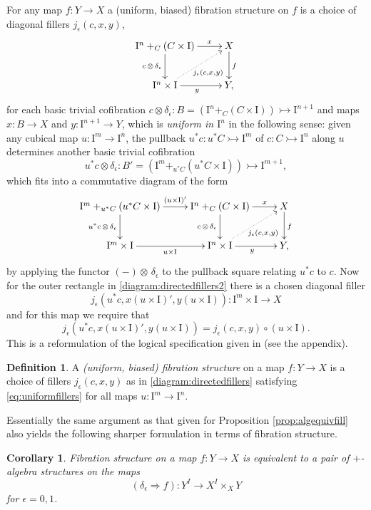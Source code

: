 \documentclass[12pt]{article}
\newcommand{\mono}{\ensuremath{\rightarrowtail}}
\newcommand{\ra}{\ensuremath{\rightarrow}}
\newcommand{\I}{\ensuremath{\mathrm{I}}}
\newtheorem{corollary}[theorem]{Corollary}
\theoremstyle{remark}
\theoremstyle{definition}
\newtheorem{definition}[theorem]{Definition}
\begin{document}
For any map $f:Y\ra X$  a (uniform, biased) fibration structure on $f$ is a choice of diagonal fillers $j_\epsilon(c,x,y)$,
\begin{equation}\label{diagram:directedfillers}
\xymatrix{
\I^n +_C (C\times\I) \ar[d]_{c\,\otimes\,\delta_\epsilon} \ar[r]^-{x} & X \ar[d]^f \\
\I^{n}\times \I \ar@{.>}[ru]_{j_\epsilon(c,x,y)} \ar[r]_y & Y,
}
\end{equation}
for each basic trivial cofibration $c \otimes \delta_\epsilon : B = (\I^n +_C (C\times\I)) \mono \I^{n+1}$ and maps $x : B\ra X$ and $y : \I^{n+1}\ra Y$, which is \emph{uniform in $\I^{n}$} in the following sense: given any cubical map $u : \I^m \ra \I^n$, the pullback $u^*c : u^*C\mono \I^m$ of $c : C\mono \I^n$ along $u$ determines another basic trivial cofibration $$u^*c \otimes \delta_\epsilon : B' = (\I^m +_{u^*C} (u^*C\times\I)) \mono \I^{m+1},$$ which fits into a commutative diagram of the form
\begin{equation}\label{diagram:directedfillers2}
\xymatrix{
\I^m +_{u^*C} (u^*C\times\I) \ar[d]_{u^*c\,\otimes\,\delta_\epsilon} \ar[r]^-{(u\times\I)'} & \I^n +_C (C\times\I) \ar[d]_{c\,\otimes\,\delta_\epsilon} \ar[r]^-{x} & X \ar[d]^f \\
\I^{m}\times \I  \ar[r]_{u\times \I} & \I^{n}\times \I \ar@{.>}[ru]_{j_\epsilon(c,x,y)} \ar[r]_{y} & Y,
}
\end{equation}
by applying the functor $(-)\otimes\,\delta_\epsilon$ to the pullback square relating $u^*c$ to $c$.  Now for the outer rectangle in \eqref{diagram:directedfillers2} there is a chosen diagonal filler $$j_\epsilon(u^*c,x(u\times\I)', y(u\times\I)): \I^m\times\I\ra X$$ and for this map we require that
\begin{equation}\label{eq:uniformfillers}
j_\epsilon(u^*c,x(u\times\I)', y(u\times\I)) = j_\epsilon(c,x,y)\circ(u\times \I).
\end{equation}
This is a reformulation of the logical specification given in \cite{CCHM} (see the appendix).

\begin{definition}\label{def:uniform} A \emph{(uniform, biased) fibration structure} on a map $f: Y\ra X$ is a choice of fillers $j_\epsilon(c,x,y)$ as in \eqref{diagram:directedfillers} satisfying \eqref{eq:uniformfillers} for all maps $u : \I^m\ra\I^n$.
\end{definition}

Essentially the same argument as that given for Proposition \ref{prop:algequivfill} also yields the following sharper formulation in terms of fibration structure.
\begin{corollary}\label{cor:fibstrequivplustr}
Fibration structure on a map $f : Y\ra X$ is equivalent to a pair of $+$-algebra structures on the maps $$(\delta_\epsilon\Rightarrow{f}) : Y^I \ra X^I\times_X Y$$ for $\epsilon = 0,1$.
\end{corollary}
\end{document}
